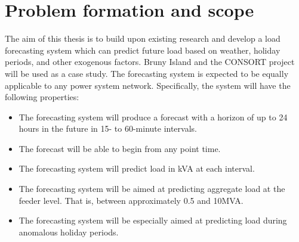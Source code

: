 \section{Problem formation and scope}
\label{scope}
The aim of this thesis is to build upon existing research and develop a load forecasting system which can predict future load based on weather, holiday periods, and other exogenous factors. 
Bruny Island and the CONSORT project will be used as a case study. 
The forecasting system is expected to be equally applicable to any power system network.
Specifically, the system will have the following properties:
\begin{itemize}
	\item The forecasting system will produce a forecast with a horizon of up to 24 hours in the future in 15- to 60-minute intervals.
	\item The forecast will be able to begin from any point time.
	\item The forecasting system will predict load in kVA at each interval.
	\item The forecasting system will be aimed at predicting aggregate load at the feeder level. That is, between approximately 0.5 and 10MVA.
	\item The forecasting system will be especially aimed at predicting load during anomalous holiday periods.
\end{itemize}
